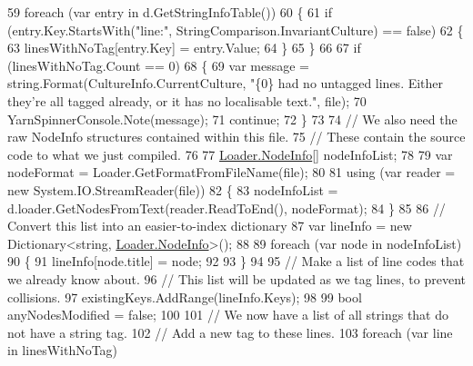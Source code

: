 \begin{DoxyCode}
59                 \textcolor{keywordflow}{foreach} (var entry \textcolor{keywordflow}{in} d.GetStringInfoTable())
60                 \{
61                     \textcolor{keywordflow}{if} (entry.Key.StartsWith(\textcolor{stringliteral}{"line:"}, StringComparison.InvariantCulture) == \textcolor{keyword}{false})
62                     \{
63                         linesWithNoTag[entry.Key] = entry.Value;
64                     \}
65                 \}
66 
67                 \textcolor{keywordflow}{if} (linesWithNoTag.Count == 0)
68                 \{
69                     var message = string.Format(CultureInfo.CurrentCulture, \textcolor{stringliteral}{"\{0\} had no untagged lines.
       Either they're all tagged already, or it has no localisable text."}, file);
70                     YarnSpinnerConsole.Note(message);
71                     \textcolor{keywordflow}{continue};
72                 \}
73 
74                 \textcolor{comment}{// We also need the raw NodeInfo structures contained within this file.}
75                 \textcolor{comment}{// These contain the source code to what we just compiled.}
76 
77                 \hyperlink{a00131}{Loader.NodeInfo}[] nodeInfoList;
78 
79                 var nodeFormat = Loader.GetFormatFromFileName(file);
80 
81                 \textcolor{keyword}{using} (var reader = \textcolor{keyword}{new} System.IO.StreamReader(file))
82                 \{
83                     nodeInfoList = d.loader.GetNodesFromText(reader.ReadToEnd(), nodeFormat);
84                 \}
85 
86                 \textcolor{comment}{// Convert this list into an easier-to-index dictionary}
87                 var lineInfo = \textcolor{keyword}{new} Dictionary<string, \hyperlink{a00131}{Loader.NodeInfo}>();
88 
89                 \textcolor{keywordflow}{foreach} (var node \textcolor{keywordflow}{in} nodeInfoList)
90                 \{
91                     lineInfo[node.title] = node;
92 
93                 \}
94 
95                 \textcolor{comment}{// Make a list of line codes that we already know about.}
96                 \textcolor{comment}{// This list will be updated as we tag lines, to prevent collisions.}
97                 existingKeys.AddRange(lineInfo.Keys);
98 
99                 \textcolor{keywordtype}{bool} anyNodesModified = \textcolor{keyword}{false};
100 
101                 \textcolor{comment}{// We now have a list of all strings that do not have a string tag.}
102                 \textcolor{comment}{// Add a new tag to these lines.}
103                 \textcolor{keywordflow}{foreach} (var line \textcolor{keywordflow}{in} linesWithNoTag)

\end{DoxyCode}
